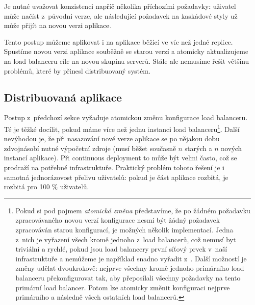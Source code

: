             Je nutné uvažovat konzistenci napříč několika příchozími \HTTP požadavky: uživatel může načíst \HTML z~původní verze, ale následující \HTTP požadavek na kaskádové styly už může přijít na novou verzi aplikace.

            Tento postup můžeme aplikovat i na aplikace běžící ve víc než jedné replice. Spustíme novou verzi aplikace souběžně se starou verzí a atomicky aktualizujeme na load balanceru cíle na novou skupinu serverů. Stále ale nemusíme řešit většinu problémů, které by přinesl distribuovaný systém.

        \subsection{Distribuovaná aplikace}
            \label{subsec:distributed-apps}
            Postup z~předchozí sekce vyžaduje atomickou změnu konfigurace load balanceru. Té je těžké docílit, pokud máme více než jednu instanci load balanceru\footnote{Pokud si pod pojmem \textit{atomická změna} představíme, že po žádném požadavku zpracovávaného novou verzí konfigurace nesmí být žádný požadavek zpracováván starou konfigurací, je možných několik implementací. Jedna z~nich je vyřazení všech kromě jednoho z~load balancerů, což nemusí byt triviální a rychlé, pokud jsou load balancery první síťový prvek v~naší infrastruktuře a nemůžeme je například snadno vyřadit z~. Další možností je změny udělat dvoukrokově: nejprve všechny kromě jednoho primárního load balanceru překonfigurovat tak, aby přeposílali všechny požadavky na tento primární load balancer. Potom lze atomicky změnit konfiguraci nejprve primárního a následně všech ostatních load balancerů.}. Další nevýhodou je, že při nasazování nové verze aplikace se po nějakou dobu zdvojnásobí nutné výpočetní zdroje (musí běžet současně $n$ starých a $n$ nových instancí aplikace). Při continuous deployment to může být velmi často, což se prodraží na potřebné infrastruktuře. Praktický problém tohoto řešení je i samotná jednorázovost přelivu uživatelů: pokud je část aplikace rozbitá, je rozbitá pro 100 \% uživatelů.

